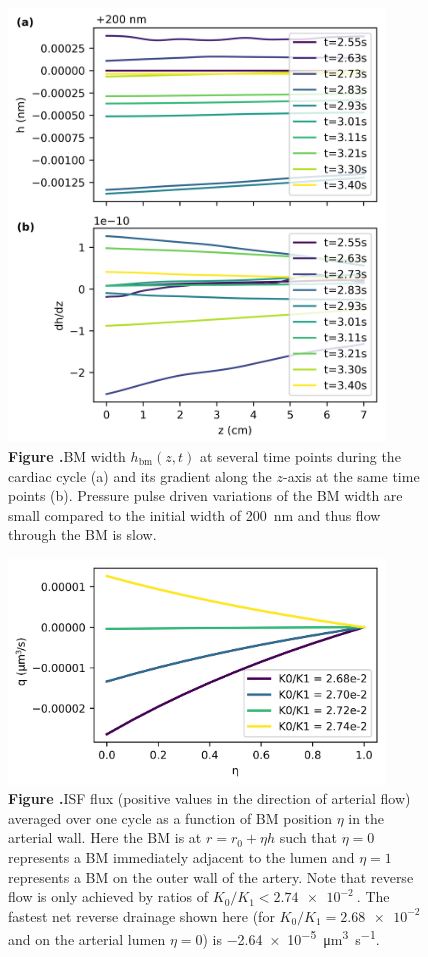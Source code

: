 \documentclass{frontiersFPHY} %
\begin{document}
\begin{figure}[h!]
\centering
\includegraphics[width=10cm]{figures/h_dh.png}
\textbf{\label{fig:h} Figure .}{BM width $h_\textrm{bm}(z,t)$ at several time points during the cardiac cycle (a) and its gradient along the $z$-axis at the same time points (b). Pressure pulse driven variations of the BM width are small compared to the initial width of \SI{200}{\nano\metre} and thus flow through the BM is slow.}
\end{figure}

\begin{figure}[h!]
\centering
\includegraphics[width=10cm]{figures/valve_test.png}
\textbf{\label{fig:valve_test} Figure .}{ISF flux (positive values in the direction of arterial flow) averaged over one cycle as a function of BM position $\eta$ in the arterial wall. Here the BM is at $r = r_0 + \eta h$ such that $\eta = 0$ represents a BM immediately adjacent to the lumen and $\eta = 1$ represents a BM on the outer wall of the artery. Note that reverse flow is only achieved by ratios of $K_0/K_1 < \SI{2.74e-2}{}$. The fastest net reverse drainage shown here (for $K_0/K_1 = \SI{2.68e-2}{}$ and on the arterial lumen $\eta = 0$) is \SI{-2.64e-5}{\cubic\micro\metre\per\second}.}
\end{figure}
\end{document}
